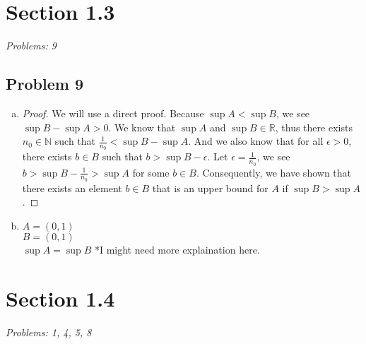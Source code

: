 \documentclass[12pt]{article}
\begin{document}

\section*{Section 1.3}
\textit{Problems: 9}

\subsection*{Problem 9}
\begin{enumerate}[a).]
    \item {
    \begin{proof}
    We will use a direct proof. 
    Because $\sup A < \sup B$, we see $\sup B - \sup A > 0$.
    We know that $\sup A$ and $ \sup B \in \mathbb{R}$, thus there exists $n_0 \in \mathbb{N}$ such that $\frac{1}{n_0} < \sup B - \sup A$. 
    And we also know that for all $\epsilon > 0$, there exists $b \in B$ such that $b > \sup B - \epsilon$. 
    Let $\epsilon = \frac{1}{n_0}$, we see $b > \sup B - \frac{1}{n_0} > \sup A$ for some $b \in B$. 
    Consequently, we have shown that there exists an element $b \in B$ that is an upper bound for $A$ if $\sup B > \sup A$. 
    \end{proof}
    }

    \item {
    $A = \left( 0,1 \right)$\\
    $B = \left( 0, 1\right)$\\
    $\sup A = \sup B$
    *I might need more explaination here.

    }

\end{enumerate}



\vspace*{1cm}


\section*{Section 1.4}
\textit{Problems: 1, 4, 5, 8}
\end{document}
